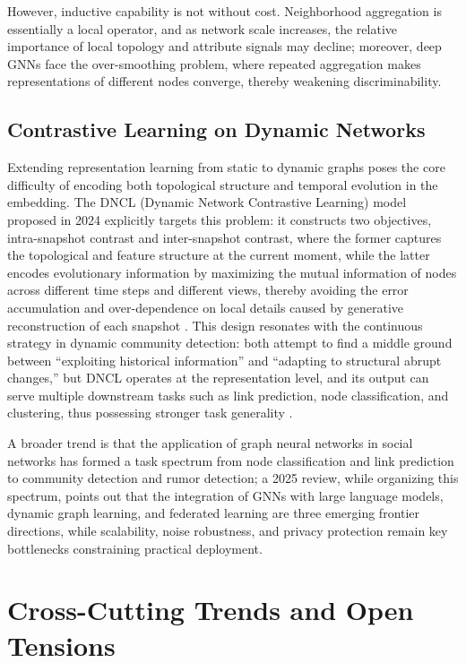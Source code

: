 \documentclass[12pt,a4paper]{article}
\begin{document}
However, inductive capability is not without cost. Neighborhood aggregation is essentially a local operator, and as network scale increases, the relative importance of local topology and attribute signals may decline; moreover, deep GNNs face the over-smoothing problem, where repeated aggregation makes representations of different nodes converge, thereby weakening discriminability.

\subsection{Contrastive Learning on Dynamic Networks}

Extending representation learning from static to dynamic graphs poses the core difficulty of encoding both topological structure and temporal evolution in the embedding. The DNCL (Dynamic Network Contrastive Learning) model proposed in 2024 explicitly targets this problem: it constructs two objectives, intra-snapshot contrast and inter-snapshot contrast, where the former captures the topological and feature structure at the current moment, while the latter encodes evolutionary information by maximizing the mutual information of nodes across different time steps and different views, thereby avoiding the error accumulation and over-dependence on local details caused by generative reconstruction of each snapshot \cite{ref13}. This design resonates with the continuous strategy in dynamic community detection: both attempt to find a middle ground between ``exploiting historical information'' and ``adapting to structural abrupt changes,'' but DNCL operates at the representation level, and its output can serve multiple downstream tasks such as link prediction, node classification, and clustering, thus possessing stronger task generality \cite{ref12}.

A broader trend is that the application of graph neural networks in social networks has formed a task spectrum from node classification and link prediction to community detection and rumor detection; a 2025 review, while organizing this spectrum, points out that the integration of GNNs with large language models, dynamic graph learning, and federated learning are three emerging frontier directions, while scalability, noise robustness, and privacy protection remain key bottlenecks constraining practical deployment.

\section{Cross-Cutting Trends and Open Tensions}
\end{document}
